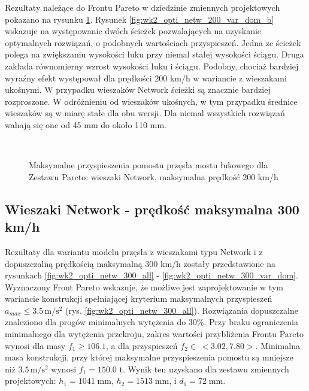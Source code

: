 Rezultaty należące do Frontu Pareto w dziedzinie zmiennych projektowych pokazano na rysunku \ref{fig:wk2_opti_netw_200_var_dom}. Rysunek \ref{fig:wk2_opti_netw_200_var_dom_b} wskazuje na występowanie dwóch ścieżek pozwalających na uzyskanie optymalnych rozwiązań, o podobnych wartościach przyspieszeń. Jedna ze ścieżek polega na zwiększaniu wysokości łuku przy niemal stałej wysokości ściągu. Druga zakłada równomierny wzrost wysokości łuku i ściągu. Podobny, chociaż bardziej wyraźny efekt występował dla prędkości 200 km/h w wariancie z wieszakami ukośnymi. W przypadku wieszaków Network ścieżki są znacznie bardziej rozproszone. W odróżnieniu od wieszaków ukośnych, w tym przypadku średnice wieszaków są w miarę stałe dla obu wersji. Dla niemal wszystkich rozwiązań wahają się one od 45 mm do około 110 mm.

\begin{figure}[hbt!]
	\centering
	\\
	\captionsetup{justification=centering}
	\caption{Maksymalne przyspieszenia pomostu przęsła mostu łukowego dla Zestawu Pareto: wieszaki Network, maksymalna prędkość 200 km/h}
	\label{fig:wk2_opti_netw_200_var_dom}
\end{figure}



\pagebreak[4]
\subsection{Wieszaki Network - prędkość maksymalna 300 km/h}

Rezultaty dla wariantu modelu przęsła z wieszakami typu Network i z dopuszczalną prędkością maksymalną 300 km/h zostały przedstawione na rysunkach \ref{fig:wk2_opti_netw_300_all} - \ref{fig:wk2_opti_netw_300_var_dom}. Wyznaczony Front Pareto wskazuje, że możliwe jest zaprojektowanie w tym wariancie konstrukcji spełniającej kryterium maksymalnych przyspieszeń $a_{max}\le 3.5\,\mathrm{m/s^2}$ (rys. \ref{fig:wk2_opti_netw_300_all}). Rozwiązania dopuszczalne znaleziono dla progów minimalnych wytężenia do 30\%. Przy braku ograniczenia minimalnego dla wytężenia przekroju, zakres wartości przybliżenia Frontu Pareto wynosi dla masy $f_1 \ge 106.1$, a dla przyspieszeń $f_2 \in\,<3.02,7.80>$. Minimalna masa konstrukcji, przy której maksymalne przyspieszenia pomostu są mniejsze niż $3.5\,\mathrm{m/s^2}$ wynosi $f_1 = 150.0$ t. Wynik ten uzyskano dla zestawu zmiennych projektowych: $h_1 = 1041\;\mathrm{mm}$, $h_2 = 1513\;\mathrm{mm}$, i $d_1 = 72\;\mathrm{mm}$.

